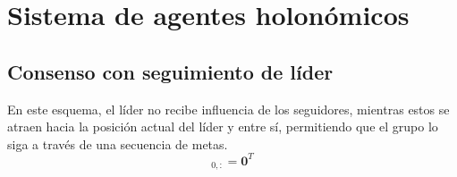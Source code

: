 \section{Sistema de agentes holonómicos}
\subsection{Consenso con seguimiento de líder}
En este esquema, el líder no recibe influencia de los seguidores, mientras estos se atraen hacia la posición actual del líder y entre sí, permitiendo que el grupo lo siga a través de una secuencia de metas.
\begin{equation*}
    [A]_{0,:} = \mathbf{0}^T
\end{equation*}
